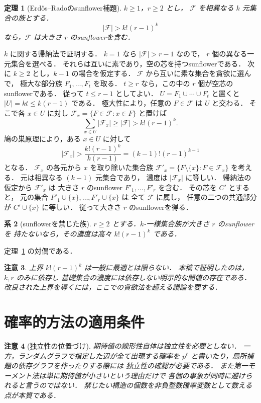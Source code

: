 \documentclass[a5paper,10pt,onecolumn]{jsarticle}
\makeatletter
\theoremstyle{mathnotetheorem}
\newtheorem{theorem}{定理}[section]
\newtheorem{corollary}[theorem]{系}
\newtheorem{remark}[theorem]{注意}
\renewcommand{\proofname}{証明}
\renewenvironment{proof}[1][\proofname]{%
  \par\pushQED{\qed}\normalfont\topsep4\p@\@plus2\p@\relax
  \trivlist\item[\hskip\labelsep\bfseries #1]\ignorespaces
}{\popQED\endtrivlist\@endpefalse}
\makeatother
\begin{document}
\begin{theorem}[Erd\H{o}s--Radoのsunflower補題]\label{thm:sunflower}
$k\ge1$，$r\ge2$ とし，
$\mathcal F$ を相異なる $k$ 元集合の族とする．
\begin{equation}\label{eq:sunflower}
 |\mathcal F|>k!(r-1)^k
\end{equation}
なら，$\mathcal F$ は大きさ $r$ のsunflowerを含む．
\end{theorem}
\begin{proof}
$k$ に関する帰納法で証明する．
$k=1$ なら $|\mathcal F|>r-1$ なので，
$r$ 個の異なる一元集合を選べる．
それらは互いに素であり，空の芯を持つsunflowerである．
次に $k\ge2$ とし，$k-1$ の場合を仮定する．
$\mathcal F$ から互いに素な集合を貪欲に選んで，
極大な部分族 $F_1,\ldots,F_t$ を取る．
$t\ge r$ なら，この中の $r$ 個が空芯のsunflowerである．
従って $t\le r-1$ としてよい．
$U=F_1\cup\cdots\cup F_t$ と置くと $|U|=kt\le k(r-1)$ である．
極大性により，任意の $F\in\mathcal F$ は $U$ と交わる．
そこで各 $x\in U$ に対し
$\mathcal F_x=\{F\in\mathcal F:x\in F\}$ と置けば
\[
 \sum_{x\in U}|\mathcal F_x|\ge|\mathcal F|
 >k!(r-1)^k.
\]
鳩の巣原理により，ある $x\in U$ に対して
\[
 |\mathcal F_x|>
 \frac{k!(r-1)^k}{k(r-1)}
 =(k-1)!(r-1)^{k-1}
\]
となる．
$\mathcal F_x$ の各元から $x$ を取り除いた集合族
$\mathcal F'_x=\{F\setminus\{x\}:F\in\mathcal F_x\}$ を考える．
元は相異なる $(k-1)$ 元集合であり，
濃度は $|\mathcal F_x|$ に等しい．
帰納法の仮定から $\mathcal F'_x$ は
大きさ $r$ のsunflower $F'_1,\ldots,F'_r$ を含む．
その芯を $C'$ とすると，
元の集合 $F'_1\cup\{x\},\ldots,F'_r\cup\{x\}$ は
全て $\mathcal F$ に属し，
任意の二つの共通部分が $C'\cup\{x\}$ に等しい．
従って大きさ $r$ のsunflowerを得る．
\end{proof}

\begin{corollary}[sunflowerを禁じた族]
$r\ge2$ とする．$k$-一様集合族が大きさ $r$ のsunflowerを
持たないなら，その濃度は高々 $k!(r-1)^k$ である．
\end{corollary}
\begin{proof}
定理~\ref{thm:sunflower} の対偶である．
\end{proof}

\begin{remark}
上界 $k!(r-1)^k$ は一般に最適とは限らない．
本稿で証明したのは，$k,r$ のみに依存し
基礎集合の濃度には依存しない明示的な閾値の存在である．
改良された上界を導くには，ここでの貪欲法を超える議論を要する．
\end{remark}

\section{確率的方法の適用条件}
\begin{remark}[独立性の位置づけ]
期待値の線形性自体は独立性を必要としない．
一方，ランダムグラフで指定した辺が全て出現する確率を
$p^{\ell}$ と書いたり，局所補題の依存グラフを作ったりする際には
独立性の確認が必要である．
また第一モーメント法は単に期待値が小さいという理由だけで
各個の事象が同時に避けられると言うのではない．
禁じたい構造の\emph{個数}を非負整数確率変数として数える点が本質である．
\end{remark}
\end{document}
